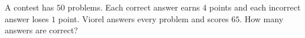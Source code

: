 A contest has $50$ problems. Each correct answer earns $4$ points and each incorrect answer loses $1$ point. Viorel answers every problem and scores $65$. How many answers are correct?
